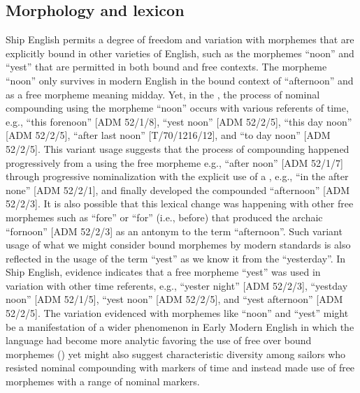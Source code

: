 \subsection{{Morphology and lexicon}}\label{sec:5.2.1}

Ship English permits a degree of freedom and variation with morphemes that are explicitly bound in other varieties of English, such as the morphemes “noon” and “yest” that are permitted in both bound and free contexts. The morpheme “noon” only survives in modern English in the bound context of “afternoon” and as a free morpheme meaning midday. Yet, in the , the process of nominal compounding using the morpheme “noon” occurs with various referents of time, e.g., “this forenoon” [ADM 52/1/8], “yest noon” [ADM 52/2/5], “this day noon” [ADM 52/2/5], “after last noon” [T/70/1216/12], and “to day noon” [ADM 52/2/5]. This variant usage suggests that the process of compounding happened progressively from a  using the free morpheme e.g., “after noon” [ADM 52/1/7] through progressive nominalization with the explicit use of a , e.g., “in the after none” [ADM 52/2/1], and finally developed the compounded  “afternoon” [ADM 52/2/3]. It is also possible that this lexical change was happening with other free morphemes such as “fore” or “for” (i.e., before) that produced the archaic  “fornoon” [ADM 52/2/3] as an antonym to the term “afternoon”. Such variant usage of what we might consider bound morphemes by modern standards is also reflected in the usage of the term “yest” as we know it from the  “yesterday”.  In Ship English, evidence indicates that a free morpheme “yest” was used in variation with other time referents, e.g., “yester night” [ADM 52/2/3], “yestday noon” [ADM 52/1/5], “yest noon” [ADM 52/2/5], and “yest afternoon” [ADM 52/2/5]. The variation evidenced with morphemes like “noon” and “yest” might be a manifestation of a wider phenomenon in Early Modern English in which the language had become more analytic favoring the use of free over bound morphemes (\citealt{MillwardHayes2012}) yet might also suggest characteristic diversity among sailors who resisted nominal compounding with markers of time and instead made use of free morphemes with a range of nominal markers.  

